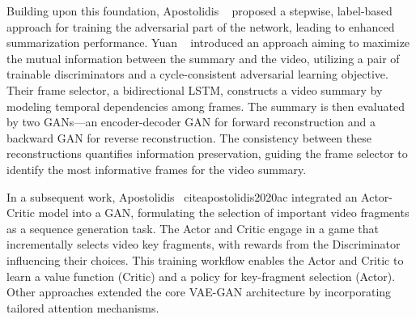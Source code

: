 Building upon this foundation, Apostolidis \etal~\cite{apostolidis2019stepwise} proposed a stepwise, label-based approach for training the adversarial part of the network, leading to enhanced summarization performance. Yuan \etal~\cite{yuan2019cycle} introduced an approach aiming to maximize the mutual information between the summary and the video, utilizing a pair of trainable discriminators and a cycle-consistent adversarial learning objective. Their frame selector, a bidirectional LSTM, constructs a video summary by modeling temporal dependencies among frames. The summary is then evaluated by two GANs—an encoder-decoder GAN for forward reconstruction and a backward GAN for reverse reconstruction. The consistency between these reconstructions quantifies information preservation, guiding the frame selector to identify the most informative frames for the video summary.

In a subsequent work, Apostolidis \etal~cite{apostolidis2020ac} integrated an Actor-Critic model into a GAN, formulating the selection of important video fragments as a sequence generation task. The Actor and Critic engage in a game that incrementally selects video key fragments, with rewards from the Discriminator influencing their choices. This training workflow enables the Actor and Critic to learn a value function (Critic) and a policy for key-fragment selection (Actor). Other approaches extended the core VAE-GAN architecture by incorporating tailored attention mechanisms.


